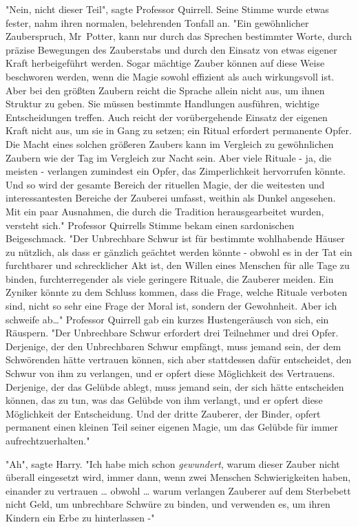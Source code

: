 {"Nein, nicht dieser Teil", sagte Professor Quirrell. Seine Stimme wurde etwas fester, nahm ihren normalen, belehrenden Tonfall an. "Ein gewöhnlicher Zauberspruch, Mr~Potter, kann nur durch das Sprechen bestimmter Worte, durch präzise Bewegungen des Zauberstabs und durch den Einsatz von etwas eigener Kraft herbeigeführt werden. Sogar mächtige Zauber können auf diese Weise beschworen werden, wenn die Magie sowohl effizient als auch wirkungsvoll ist. Aber bei den größten Zaubern reicht die Sprache allein nicht aus, um ihnen Struktur zu geben. Sie müssen bestimmte Handlungen ausführen, wichtige Entscheidungen treffen. Auch reicht der vorübergehende Einsatz der eigenen Kraft nicht aus, um sie in Gang zu setzen; ein Ritual erfordert permanente Opfer. Die Macht eines solchen größeren Zaubers kann im Vergleich zu gewöhnlichen Zaubern wie der Tag im Vergleich zur Nacht sein. Aber viele Rituale - ja, die meisten - verlangen zumindest ein Opfer, das Zimperlichkeit hervorrufen könnte. Und so wird der gesamte Bereich der rituellen Magie, der die weitesten und interessantesten Bereiche der Zauberei umfasst, weithin als Dunkel angesehen. Mit ein paar Ausnahmen, die durch die Tradition herausgearbeitet wurden, versteht sich." Professor Quirrells Stimme bekam einen sardonischen Beigeschmack. "Der Unbrechbare Schwur ist für bestimmte wohlhabende Häuser zu nützlich, als dass er gänzlich geächtet werden könnte - obwohl es in der Tat ein furchtbarer und schrecklicher Akt ist, den Willen eines Menschen für alle Tage zu binden, furchterregender als viele geringere Rituale, die Zauberer meiden. Ein Zyniker könnte zu dem Schluss kommen, dass die Frage, welche Rituale verboten sind, nicht so sehr eine Frage der Moral ist, sondern der Gewohnheit. Aber ich schweife ab…" Professor Quirrell gab ein kurzes Hustengeräusch von sich, ein Räuspern. "Der Unbrechbare Schwur erfordert drei Teilnehmer und drei Opfer. Derjenige, der den Unbrechbaren Schwur empfängt, muss jemand sein, der dem Schwörenden hätte vertrauen können, sich aber stattdessen dafür entscheidet, den Schwur von ihm zu verlangen, und er opfert diese Möglichkeit des Vertrauens. Derjenige, der das Gelübde ablegt, muss jemand sein, der sich hätte entscheiden können, das zu tun, was das Gelübde von ihm verlangt, und er opfert diese Möglichkeit der Entscheidung. Und der dritte Zauberer, der Binder, opfert permanent einen kleinen Teil seiner eigenen Magie, um das Gelübde für immer aufrechtzuerhalten."

"Ah", sagte Harry. "Ich habe mich schon \emph{gewundert}, warum dieser Zauber nicht überall eingesetzt wird, immer dann, wenn zwei Menschen Schwierigkeiten haben, einander zu vertrauen … obwohl … warum verlangen Zauberer auf dem Sterbebett nicht Geld, um unbrechbare Schwüre zu binden, und verwenden es, um ihren Kindern ein Erbe zu hinterlassen -"

}
